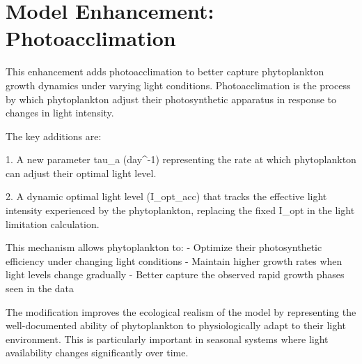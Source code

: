 \section{Model Enhancement: Photoacclimation}

This enhancement adds photoacclimation to better capture phytoplankton growth dynamics under varying light conditions. Photoacclimation is the process by which phytoplankton adjust their photosynthetic apparatus in response to changes in light intensity.

The key additions are:

1. A new parameter tau_a (day^-1) representing the rate at which phytoplankton can adjust their optimal light level.

2. A dynamic optimal light level (I_opt_acc) that tracks the effective light intensity experienced by the phytoplankton, replacing the fixed I_opt in the light limitation calculation.

This mechanism allows phytoplankton to:
- Optimize their photosynthetic efficiency under changing light conditions
- Maintain higher growth rates when light levels change gradually
- Better capture the observed rapid growth phases seen in the data

The modification improves the ecological realism of the model by representing the well-documented ability of phytoplankton to physiologically adapt to their light environment. This is particularly important in seasonal systems where light availability changes significantly over time.
